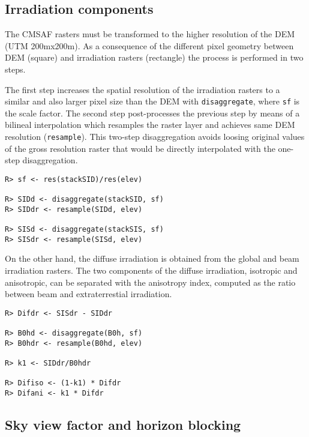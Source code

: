 \documentclass[authoryear, sort&compress]{elsarticle}
\begin{document}
\subsection{Irradiation components}
\label{sec-1-4}

The CMSAF rasters must be transformed to the higher resolution of
the DEM (UTM 200mx200m). As a consequence of the different pixel
geometry between DEM (square) and irradiation rasters (rectangle)
the process is performed in two steps. 

The first step increases the spatial resolution of the irradiation
rasters to a similar and also larger pixel size than the DEM with
\texttt{disaggregate}, where \texttt{sf} is the scale factor. The
second step post-processes the previous step by means of a
bilineal interpolation which resamples the raster layer and
achieves same DEM resolution (\texttt{resample}). This two-step
disaggregation avoids loosing original values of the gross
resolution raster that would be directly interpolated with the
one-step disaggregation.

\lstset{language=R,numbers=none}
\begin{lstlisting} 
R> sf <- res(stackSID)/res(elev)

R> SIDd <- disaggregate(stackSID, sf)
R> SIDdr <- resample(SIDd, elev)

R> SISd <- disaggregate(stackSIS, sf)
R> SISdr <- resample(SISd, elev)
\end{lstlisting}

On the other hand, the diffuse irradiation is obtained from the global
and beam irradiation rasters. The two components of the diffuse
irradiation, isotropic and anisotropic, can be separated with the
anisotropy index, computed as the ratio between beam and
extraterrestial irradiation.

\lstset{language=R,numbers=none}
\begin{lstlisting} 
R> Difdr <- SISdr - SIDdr

R> B0hd <- disaggregate(B0h, sf)
R> B0hdr <- resample(B0hd, elev)

R> k1 <- SIDdr/B0hdr

R> Difiso <- (1-k1) * Difdr
R> Difani <- k1 * Difdr
\end{lstlisting}


\subsection{Sky view factor and horizon blocking}
\label{sec-1-5}
\end{document}
